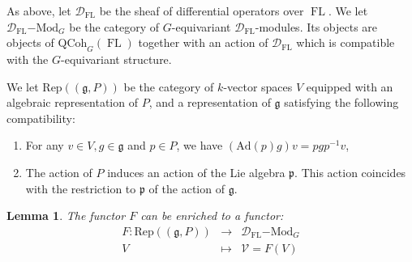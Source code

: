 \documentclass[10pt, oneside]{amsart}
\numberwithin{equation}{subsection}
\newtheorem{lemma}[equation]{Lemma}
\theoremstyle{definition}
\theoremstyle{remark}
\newcommand{\opn}[1]{\operatorname{#1}}
\begin{document}
As above, let $\mathcal{D}_{\opn{FL}}$ be the sheaf of differential operators over $\opn{FL}$. We let $\mathcal{D}_{\opn{FL}}\mathrm{-Mod}_G$ be the category of $G$-equivariant $\mathcal{D}_{\opn{FL}}$-modules. Its objects are objects of $\mathrm{QCoh}_{G}(\opn{FL})$ together with an action of $\mathcal{D}_{\opn{FL}}$ which is compatible with the $G$-equivariant structure. 


We let $\mathrm{Rep}(( \mathfrak{g},P))$ be the category of $k$-vector spaces $V$ equipped with an algebraic representation of $P$, and a representation of $\mathfrak{g}$ satisfying the following compatibility: 
\begin{enumerate}
\item For any $v \in V, g \in \mathfrak{g}$ and $p \in P$, we have $(\mathrm{Ad}(p) g) v = p g p^{-1} v$,
\item The action of $P$ induces an action of the Lie algebra $\mathfrak{p}$. This action coincides with the  restriction to $\mathfrak{p}$ of the action of $\mathfrak{g}$. 
\end{enumerate}



\begin{lemma} \label{FEnrichedLemmaAppendix}
The functor $F$ can be enriched to a functor: 
\begin{eqnarray*}
F :  \mathrm{Rep}((\mathfrak{g},P))  & \rightarrow & \mathcal{D}_{\opn{FL}}\mathrm{-Mod}_G \\
V & \mapsto & \mathcal{V}=F(V)
\end{eqnarray*}
\end{lemma}
\end{document}
